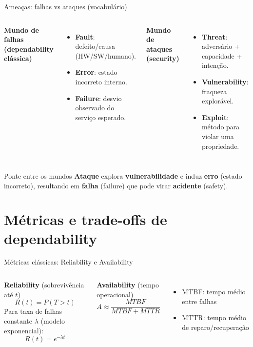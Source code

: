 \documentclass{beamer}
\begin{document}
\begin{frame}{Ameaças: falhas vs ataques (vocabulário)}
\begin{columns}[T,onlytextwidth]
\textbf{Mundo de falhas (dependability clássica)}
\begin{itemize}
  \item \textbf{Fault}: defeito/causa (HW/SW/humano).
  \item \textbf{Error}: estado incorreto interno.
  \item \textbf{Failure}: desvio observado do serviço esperado.
\end{itemize}

\textbf{Mundo de ataques (security)}
\begin{itemize}
  \item \textbf{Threat}: adversário + capacidade + intenção.
  \item \textbf{Vulnerability}: fraqueza explorável.
  \item \textbf{Exploit}: método para violar uma propriedade.
\end{itemize}
\end{columns}

\vspace{0.4em}
\begin{block}{Ponte entre os mundos}
\textbf{Ataque} explora \textbf{vulnerabilidade} e induz \textbf{erro} (estado incorreto), resultando em \textbf{falha} (failure) que pode virar \textbf{acidente} (safety).
\end{block}
\end{frame}

\section{Métricas e trade-offs de dependability}

\begin{frame}{Métricas clássicas: Reliability e Availability}
\begin{columns}[T,onlytextwidth]
\textbf{Reliability} (sobrevivência até $t$)
\[
R(t)=P(T>t)
\]
Para taxa de falhas constante $\lambda$ (modelo exponencial):
\[
R(t)=e^{-\lambda t}
\]

\textbf{Availability} (tempo operacional)
\[
A \approx \frac{MTBF}{MTBF+MTTR}
\]
\begin{itemize}
  \item MTBF: tempo médio entre falhas
  \item MTTR: tempo médio de reparo/recuperação
\end{itemize}
\end{columns}

\end{frame}
\end{document}
